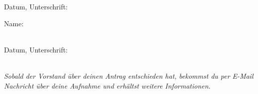 \documentclass[a5paper,10pt,headings=small]{scrartcl}
\newcommand{\signskip}{\rule{0pt}{18pt}}
\newcommand{\hinweis}[1]{\emph{#1}}
\begin{document}
Datum, Unterschrift: \hrulefill\signskip

\vfill
{}
Name: \hrulefill\signskip \\
Datum, Unterschrift: \hrulefill\signskip \\

\hinweis{Sobald der Vorstand über deinen Antrag entschieden hat, bekommst du per
E-Mail Nachricht über deine Aufnahme und erhältst weitere Informationen.}
\end{document}
